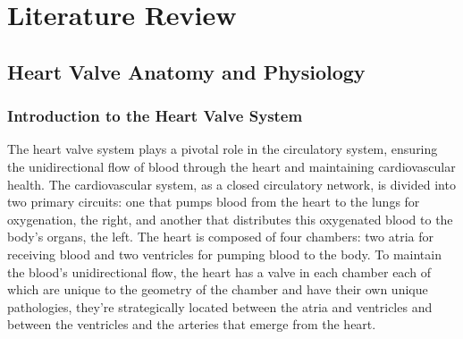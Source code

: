 \chapter{Literature Review}\label{ch:lit}

\vspace{-2.5em}

\mynewline

\section{Heart Valve Anatomy and Physiology}

\subsection{Introduction to the Heart Valve System}
The heart valve system plays a pivotal role in the circulatory system, ensuring the unidirectional flow of blood through the heart and maintaining cardiovascular health. The cardiovascular system, as a closed circulatory network, is divided into two primary circuits: one that pumps blood from the heart to the lungs for oxygenation, the right, and another that distributes this oxygenated blood to the body's organs, the left. The heart is composed of four chambers: two atria for receiving blood and two ventricles for pumping blood to the body. To maintain the blood's unidirectional flow, the heart has a valve in each chamber each of which are unique to the geometry of the chamber and have their own unique pathologies, they're strategically located between the atria and ventricles and between the ventricles and the arteries that emerge from the heart. ~
